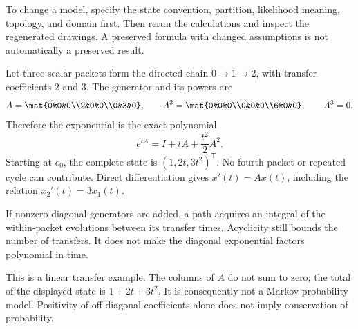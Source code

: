 To change a model, specify the state convention, partition, likelihood meaning, topology, and domain first. Then rerun the calculations and inspect the regenerated drawings. A preserved formula with changed assumptions is not automatically a preserved result.

Let three scalar packets form the directed chain $0\to1\to2$, with transfer coefficients $2$ and $3$. The generator and its powers are
\[
A=\mat{0&0&0\\2&0&0\\0&3&0},\qquad
A^2=\mat{0&0&0\\0&0&0\\6&0&0},\qquad A^3=0.
\]
Therefore the exponential is the exact polynomial
\[
e^{tA}=I+tA+\frac{t^2}{2}A^2.
\]
Starting at $e_0$, the complete state is $(1,2t,3t^2)^{\mathsf T}$. No fourth packet or repeated cycle can contribute. Direct differentiation gives $x'(t)=Ax(t)$, including the relation $x_2'(t)=3x_1(t)$.

If nonzero diagonal generators are added, a path acquires an integral of the within-packet evolutions between its transfer times. Acyclicity still bounds the number of transfers. It does not make the diagonal exponential factors polynomial in time.

This is a linear transfer example. The columns of $A$ do not sum to zero; the total of the displayed state is $1+2t+3t^2$. It is consequently not a Markov probability model. Positivity of off-diagonal coefficients alone does not imply conservation of probability.

